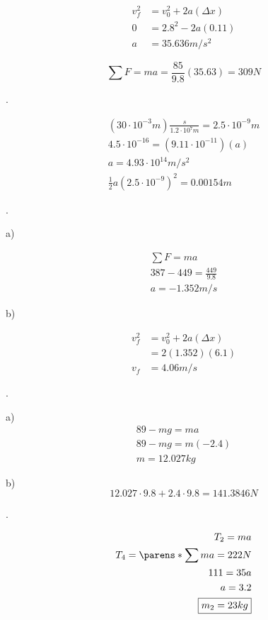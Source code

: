 \documentclass{scrreprt} %
\begin{document}
\begin{align*}
	v_f^2 &= v_0^2 + 2a(\Delta x) \\
	0 &= 2.8^2 - 2a(0.11) \\
	a &= 35.636 m/s^2
\end{align*}

$$
\sum F = ma = \frac{85}{9.8}(35.63) = \boxed{309N}
$$

.

\begin{align*}
	(30\cdot 10^{-3} m)\frac{s}{1.2\cdot 10^7 m} = 2.5 \cdot 10^{-9} m \\
	4.5\cdot 10^{-16} = (9.11\cdot 10^{-11})(a) \\
	a = 4.93\cdot 10^{14} m/s^2 \\
	\frac{1}{2} a (2.5\cdot 10^{-9})^2 = \boxed{0.00154 m}
\end{align*}

.

a)

\begin{align*}
	\sum F = ma \\
	387 - 449 = \frac{449}{9.8} \\
	\boxed{a = -1.352 m/s}
\end{align*}

b)

\begin{align*}
	v_f^2 &= v_0^2 + 2a(\Delta x) \\
		  &= 2(1.352)(6.1) \\
	  v_f &= \boxed{4.06 m/s}
\end{align*}

.

a) \begin{align*}
	89 - mg = ma \\ 
	89 - mg = m(-2.4) \\
	\boxed{m = 12.027 kg}
\end{align*}

b) $$12.027\cdot 9.8 + 2.4\cdot 9.8 = 141.3846 N$$

.

\begin{align*}
	T_2 = ma \\
	T_4 = \parens*{{\sum m}}a = 222N \\
	111 = 35a \\
	a = 3.2 \\
	\boxed{m_2 = 23 kg}
\end{align*}
\end{document}
